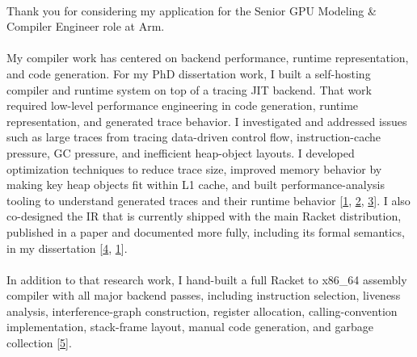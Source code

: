 

\newcommand{\dissertationurl}{https://github.com/cderici/dissertation/releases/download/latest-pdf/thesis.pdf}
\newcommand{\pycketperfurl}{https://github.com/cderici/pycket-performance}
\newcommand{\tracedrawurl}{https://github.com/cderici/trace-draw}
\newcommand{\raxurl}{https://github.com/cderici/rax}
\newcommand{\icfpreporturl}{https://dl.acm.org/doi/10.1145/3341642}
\newcommand{\atwurl}{https://github.com/cderici/around-the-world-in-26-languages}
\newcommand{\homelaburl}{https://home.dericilab.live/homelab/}

\newcommand{\cairolang}{https://github.com/cderici/around-the-world-in-compilers/blob/main/langs/cairo/README.md}
\newcommand{\edinburghurl}{https://github.com/cderici/around-the-world-in-compilers/blob/main/langs/edinburgh/README.md}



\paragraph{} %
Thank you for considering my application for the Senior GPU Modeling \& Compiler Engineer role at Arm.

\paragraph{} %
My compiler work has centered on backend performance, runtime representation, and code generation. For my PhD dissertation work, I built a self-hosting compiler and runtime system on top of a tracing JIT backend. That work required low-level performance engineering in code generation, runtime representation, and generated trace behavior. I investigated and addressed issues such as large traces from tracing data-driven control flow, instruction-cache pressure, GC pressure, and inefficient heap-object layouts. I developed optimization techniques to reduce trace size, improved memory behavior by making key heap objects fit within L1 cache, and built performance-analysis tooling to understand generated traces and their runtime behavior [\href{\dissertationurl}{1}, \href{\pycketperfurl}{2}, \href{\tracedrawurl}{3}]. I also co-designed the IR that is currently shipped with the main Racket distribution, published in a paper and documented more fully, including its formal semantics, in my dissertation [\href{\icfpreporturl}{4}, \href{\dissertationurl}{1}].

\paragraph{} %
In addition to that research work, I hand-built a full Racket to x86\_64 assembly compiler with all major backend passes, including instruction selection, liveness analysis, interference-graph construction, register allocation, calling-convention implementation, stack-frame layout, manual code generation, and garbage collection [\href{\raxurl}{5}].

